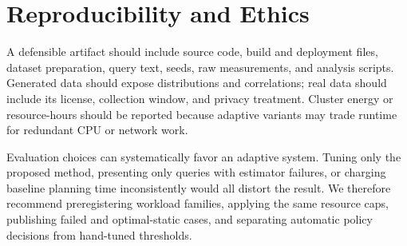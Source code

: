 \section{Reproducibility and Ethics}
\label{sec:reproducibility}

A defensible artifact should include source code, build and deployment files,
dataset preparation, query text, seeds, raw measurements, and analysis scripts.
Generated data should expose distributions and correlations; real data should
include its license, collection window, and privacy treatment.  Cluster energy
or resource-hours should be reported because adaptive variants may trade
runtime for redundant CPU or network work.

Evaluation choices can systematically favor an adaptive system.  Tuning only
the proposed method, presenting only queries with estimator failures, or
charging baseline planning time inconsistently would all distort the result.
We therefore recommend preregistering workload families, applying the same
resource caps, publishing failed and optimal-static cases, and separating
automatic policy decisions from hand-tuned thresholds.
